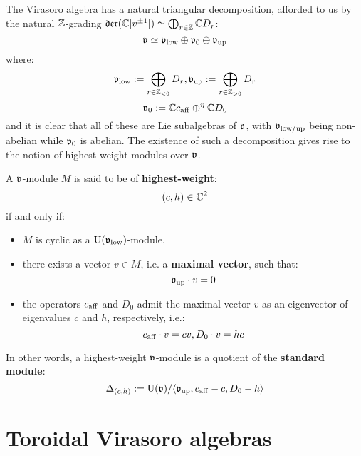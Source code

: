         The Virasoro algebra has a natural triangular decomposition, afforded to us by the natural $\mathbb{Z}$-grading $\mathfrak{der}(\mathbb{C}[v^{\pm 1}]) \simeq \bigoplus_{r \in \mathbb{Z}} \mathbb{C} D_r$:
            $$\mathfrak{v} \simeq \mathfrak{v}_{\mathrm{low}} \oplus \mathfrak{v}_0 \oplus \mathfrak{v}_{\mathrm{up}}$$
        where:
            $$\mathfrak{v}_{\mathrm{low}} := \bigoplus_{r \in \mathbb{Z}_{< 0}} D_r, \mathfrak{v}_{\mathrm{up}} := \bigoplus_{r \in \mathbb{Z}_{> 0}} D_r$$
            $$\mathfrak{v}_0 := \mathbb{C} c_{\mathrm{aff}} \oplus^{\eta} \mathbb{C} D_0$$
        and it is clear that all of these are Lie subalgebras of $\mathfrak{v}$, with $\mathfrak{v}_{\mathrm{low}/\mathrm{up}}$ being non-abelian while $\mathfrak{v}_0$ is abelian. The existence of such a decomposition gives rise to the notion of highest-weight modules over $\mathfrak{v}$.
        \begin{definition}
            A $\mathfrak{v}$-module $M$ is said to be of \textbf{highest-weight}:
                $$(c, h) \in \mathbb{C}^2$$
            if and only if:
            \begin{itemize}
                \item $M$ is cyclic as a $\mathrm{U}(\mathfrak{v}_{\mathrm{low}})$-module,
                \item there exists a vector $v \in M$, i.e. a \textbf{maximal vector}, such that:
                    $$\mathfrak{v}_{\mathrm{up}} \cdot v = 0$$
                \item the operators $c_{\mathrm{aff}}$ and $D_0$ admit the maximal vector $v$ as an eigenvector of eigenvalues $c$ and $h$, respectively, i.e.:
                    $$c_{\mathrm{aff}} \cdot v = cv, D_0 \cdot v = hc$$
            \end{itemize}
        \end{definition}
        In other words, a highest-weight $\mathfrak{v}$-module is a quotient of the \textbf{standard module}:
            $$\Delta_{(c, h)} := \mathrm{U}(\mathfrak{v})/\langle\mathfrak{v}_{\mathrm{up}}, c_{\mathrm{aff}} - c, D_0 - h\rangle$$

    \section{Toroidal Virasoro algebras}
    
    \printbibliography

